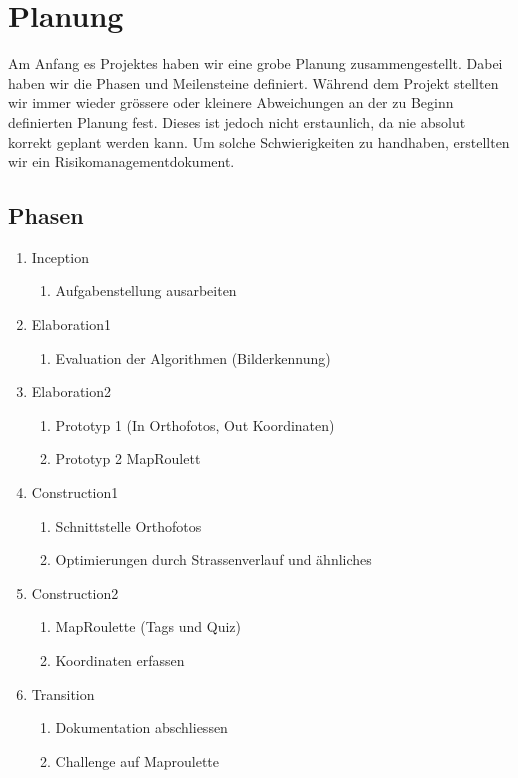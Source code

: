 \section{Planung}
Am Anfang es Projektes haben wir eine grobe Planung zusammengestellt. Dabei haben wir die Phasen und Meilensteine definiert. Während dem Projekt stellten wir immer wieder grössere oder kleinere Abweichungen an der zu Beginn definierten Planung fest. Dieses ist jedoch nicht erstaunlich, da nie absolut korrekt geplant werden kann. Um solche Schwierigkeiten zu handhaben, erstellten wir ein Risikomanagementdokument.

\subsection{Phasen}
\begin{enumerate}
  \item Inception
  \begin{enumerate}
    \item Aufgabenstellung ausarbeiten
  \end{enumerate}
  \item Elaboration1
  \begin{enumerate}
    \item Evaluation der Algorithmen (Bilderkennung)
  \end{enumerate}
  \item Elaboration2
  \begin{enumerate}
    \item Prototyp 1 (In Orthofotos, Out Koordinaten)
    \item Prototyp 2 MapRoulett
  \end{enumerate}
  \item Construction1
  \begin{enumerate}
    \item Schnittstelle Orthofotos
    \item Optimierungen durch Strassenverlauf und ähnliches
  \end{enumerate}
  \item Construction2
  \begin{enumerate}
    \item MapRoulette (Tags und Quiz)
    \item Koordinaten erfassen	
  \end{enumerate}
  \item Transition
  \begin{enumerate}
    \item Dokumentation abschliessen
    \item Challenge auf Maproulette
  \end{enumerate}
\end{enumerate}
\newpage

